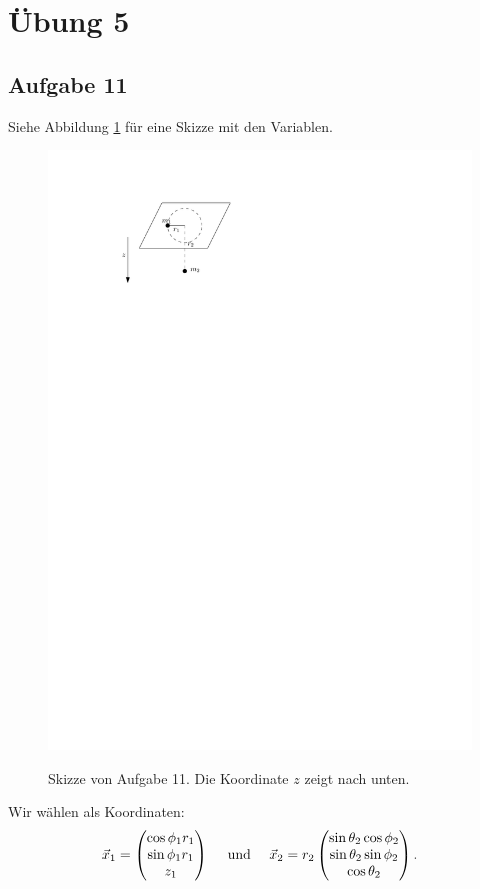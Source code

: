 \chapter*{Übung 5}

\section*{Aufgabe 11}

Siehe Abbildung \ref{fig:ueb5_aufgabe11} für eine Skizze mit den Variablen.

\begin{figure}[h]
	\centering
	\includegraphics{figures/ueb5/aufgabe11}
	\label{fig:ueb5_aufgabe11}
	\caption{Skizze von Aufgabe 11. Die Koordinate $z$ zeigt nach unten.}
\end{figure}

Wir wählen als Koordinaten:
\[
	\vec{x}_1 = \begin{pmatrix}  \cos \phi_1 r_1 \\ \sin \phi_1 r_1 \\ z_1 \end{pmatrix} 
	\quad \text{ und } \quad 
	\vec{x}_2 = r_2 \begin{pmatrix}  \sin \theta_2 \cos \phi_2 \\ \sin \theta_2 \sin \phi_2 \\ \cos \theta_2  \end{pmatrix}
	\text{.}
\]

